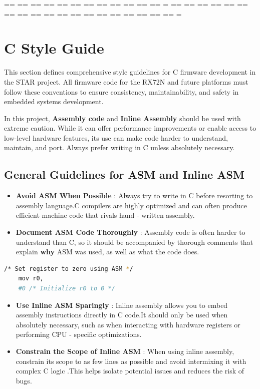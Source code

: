    == == == == == == == == == == == ==
    = %
      == == == == == == == == == == == == == == == == == == ==
    =

\newpage
\section{C Style Guide
}
\label{sec:c-style}

This section defines comprehensive style guidelines for C firmware development in the STAR project. All firmware code for the RX72N and future platforms must follow these conventions to ensure consistency, maintainability, and safety in embedded systems development.



In this project, \textbf{Assembly code} and \textbf{Inline Assembly} should be used with extreme caution. While it can offer performance improvements or enable access to low-level hardware features, its use can make code harder to understand, maintain, and port. Always prefer writing in C unless absolutely necessary.

\subsection{General Guidelines for ASM and Inline ASM
}
\begin{itemize}
\item \textbf{Avoid ASM When Possible}
    : Always try to write in C before resorting to assembly language.C compilers
          are highly optimized and can often produce efficient machine code that
              rivals hand -
    written assembly.
    \item \textbf{Document ASM Code Thoroughly}
    : Assembly code is often harder to understand than C,
    so it should be accompanied by thorough comments that explain \textbf{why} ASM was used,
    as well as what the code does.
\end{itemize}

\begin{lstlisting}[language = bash]
    /* Set register to zero using ASM */
    mov r0,
    #0 /* Initialize r0 to 0 */
\end{lstlisting}

\begin{itemize}
\item \textbf{Use Inline ASM Sparingly}
    : Inline assembly allows you to embed assembly instructions directly in C
          code.It should only be used when absolutely necessary,
    such as when interacting with hardware registers or
        performing CPU - specific optimizations.
    \item \textbf{Constrain the Scope of Inline ASM}
    : When using inline assembly,
    constrain its scope to as few lines as possible and avoid intermixing it
        with complex C logic
            .This helps isolate potential issues and reduces the risk of bugs.
\end{itemize}

